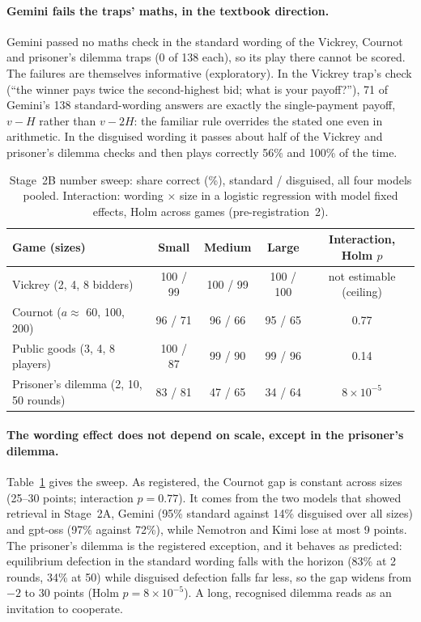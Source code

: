 \documentclass[10pt]{article}
\theoremstyle{definition}
\theoremstyle{remark}
\begin{document}
\paragraph{Gemini fails the traps' maths, in the textbook direction.} Gemini passed no maths
check in the standard wording of the Vickrey, Cournot and prisoner's dilemma traps (0 of 138
each), so its play there cannot be scored. The failures are themselves informative
(exploratory). In the Vickrey trap's check (``the winner pays twice the second-highest bid;
what is your payoff?''), 71 of Gemini's 138 standard-wording answers are exactly the
single-payment payoff, $v-H$ rather than $v-2H$: the familiar rule overrides the stated one even
in arithmetic. In the disguised wording it passes about half of the Vickrey and prisoner's
dilemma checks and then plays correctly 56\% and 100\% of the time.

\begin{table}[t]
\centering
\caption{Stage~2B number sweep: share correct (\%), standard / disguised, all four models pooled.
Interaction: wording $\times$ size in a logistic regression with model fixed effects, Holm
across games (pre-registration~2).}
\label{tab:sweep}
\small
\begin{tabular}{@{}lcccc@{}}
\toprule
Game (sizes) & Small & Medium & Large & Interaction, Holm $p$ \\
\midrule
Vickrey (2, 4, 8 bidders) & 100 / 99 & 100 / 99 & 100 / 100 & not estimable (ceiling) \\
Cournot ($a\approx$ 60, 100, 200) & 96 / 71 & 96 / 66 & 95 / 65 & 0.77 \\
Public goods (3, 4, 8 players) & 100 / 87 & 99 / 90 & 99 / 96 & 0.14 \\
Prisoner's dilemma (2, 10, 50 rounds) & 83 / 81 & 47 / 65 & 34 / 64 & $8\times10^{-5}$ \\
\bottomrule
\end{tabular}
\end{table}

\paragraph{The wording effect does not depend on scale, except in the prisoner's dilemma.}
Table~\ref{tab:sweep} gives the sweep. As registered, the Cournot gap is constant across sizes
(25--30 points; interaction $p=0.77$). It comes from the two models that showed retrieval in
Stage~2A, Gemini (95\% standard against 14\% disguised over all sizes) and gpt-oss (97\% against
72\%), while Nemotron and Kimi lose at most 9 points. The prisoner's dilemma is the registered
exception, and it behaves as predicted: equilibrium defection in the standard wording falls with
the horizon (83\% at 2 rounds, 34\% at 50) while disguised defection falls far less, so the gap
widens from $-2$ to 30 points (Holm $p=8\times10^{-5}$). A long, recognised dilemma reads as an
invitation to cooperate.
\end{document}

